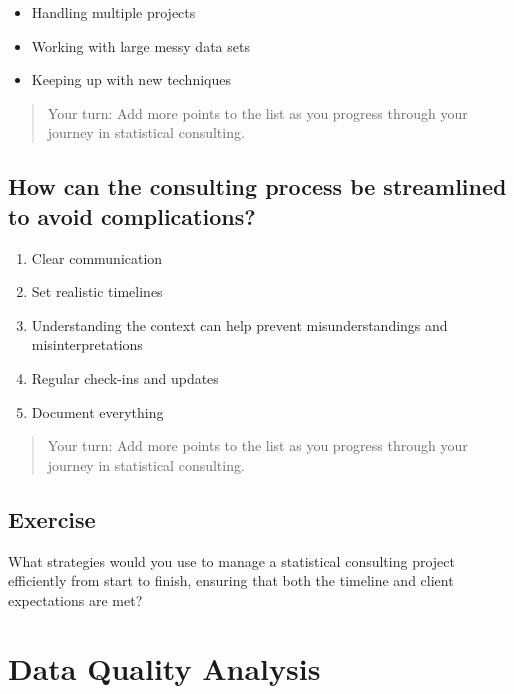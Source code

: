 \documentclass[
  letterpaper,
  DIV=11,
  numbers=noendperiod]{scrreprt}
\begin{document}
\begin{itemize}
\item
  Handling multiple projects
\item
  Working with large messy data sets
\item
  Keeping up with new techniques
\end{itemize}

\begin{quote}
Your turn: Add more points to the list as you progress through your
journey in statistical consulting.
\end{quote}

\section{How can the consulting process be streamlined to avoid
complications?}\label{how-can-the-consulting-process-be-streamlined-to-avoid-complications}

\begin{enumerate}
\def\labelenumi{\arabic{enumi}.}
\item
  Clear communication
\item
  Set realistic timelines
\item
  Understanding the context can help prevent misunderstandings and
  misinterpretations
\item
  Regular check-ins and updates
\item
  Document everything
\end{enumerate}

\begin{quote}
Your turn: Add more points to the list as you progress through your
journey in statistical consulting.
\end{quote}

\section{Exercise}\label{exercise}

What strategies would you use to manage a statistical consulting project
efficiently from start to finish, ensuring that both the timeline and
client expectations are met?


\chapter{Data Quality Analysis}\label{data-quality-analysis}
\end{document}
